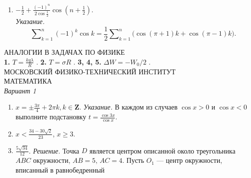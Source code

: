 \documentclass[letterpaper,9pt]{extarticle}
\begin{document}
\begin{multicols*}{2}[]
\begin{enumerate}[leftmargin=*,label=\textbf{\arabic*.},wide, labelwidth=!, labelindent=0pt,noitemsep]
            \item $\displaystyle -\frac{1}{2} + \frac{(-1)^{n}}{2\cos\frac{1}{2}}\cos\left( n+ \frac{1}{2} \right) $.\\
            \textit{Указание.}
            \[
                \bm{\sum}_{k=1}^{n}(-1)^{k}\cos k= \frac{1}{2}\bm{\sum}_{k=1}^{n}\big(\cos(\pi+1)k + \cos(\pi-1)k\big)\text{.}
            \]
        \end{enumerate}
        АНАЛОГИИ В ЗАДАЧАХ ПО ФИЗИКЕ\\
        \textbf{1.} $\displaystyle T = \frac{kq\lambda}{R}$ .\hspace{1em}
        \textbf{2.} $T=\sigma R$ .\hspace{2em}
        \textbf{3, 4, 5.} $\Delta W = -W_{0}/2$ .\\[0.5em]
        МОСКОВСКИЙ ФИЗИКО-ТЕХНИЧЕСКИЙ ИНСТИТУТ\\[0.5em]
        \textsf{МАТЕМАТИКА}\\[0.5em]
        \textit{\textsf{Вариант 1}}
        \begin{enumerate}[leftmargin=*,label=\textbf{\arabic*.},wide, labelwidth=!, labelindent=0pt,noitemsep]
            \item $\displaystyle x = \pm \frac{3\pi}{4} + 2\pi k, k \in \bm{Z} $. \textit{Указание.} В каждом из случаев $\cos x > 0$ и $\cos x < 0$ выполните подстановку $\displaystyle t = \frac{\cos 3x}{\cos x}$.
            \item $\displaystyle x < \frac{34-30\sqrt{2}}{23}$, $x \bm{\geq} 3$.
            \item $\displaystyle \frac{5\sqrt{34}}{12}$. \textit{Решение.} Точка $D$ является центром описанной около треугольника $ABC$ окружности, $AB=5\text{, }AC=4$.
            Пусть $O_{1}$ --- центр окружности, вписанный в равнобедренный
        \end{enumerate}
    \end{multicols*}
\end{document}
